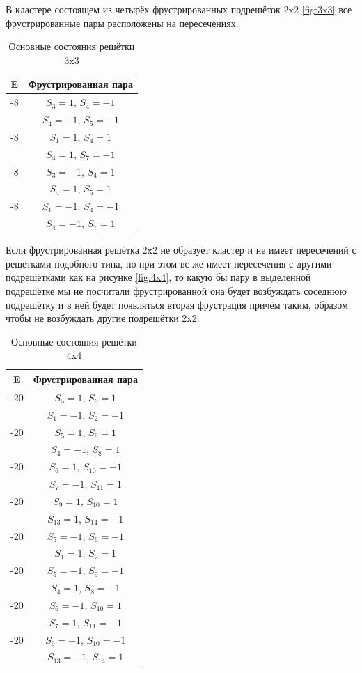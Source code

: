 \documentclass[utf8, babel, sor, jor, amsmath,amssymb, reprint]{elsarticle} %
\begin{document}
В кластере состоящем из четырёх фрустрированных подрешёток 2x2 \ref{fig:3x3} все фрустрированные пары расположены на пересечениях.

\begin{table}[h]
	\centering
	\begin{tabular}{|c|c|}
		\hline
		E   &   Фрустрированная пара \\
		\hline
		-8   &  $S_3=1$, $S_4=-1$\\
		&    $S_4=-1$, $S_5=-1$ \\
		\hline
		-8   &  $S_1=1$, $S_4=1$\\
		&    $S_4=1$, $S_7=-1$ \\
		\hline
		-8   &  $S_3=-1$, $S_4=1$\\
			&    $S_4=1$, $S_5=1$ \\
		\hline
		-8   &  $S_1=-1$, $S_4=-1$\\
			&    $S_4=-1$, $S_7=1$ \\
		\hline
	\end{tabular}
	\caption{Основные состояния решётки 3x3}
	\label{tab:gs_3x3}
\end{table} 

Если фрустрированная решётка 2x2 не образует кластер и не имеет пересечений с решётками подобного типа, но при этом вс же имеет пересечения с другими подрешётками как на  рисунке \ref{fig:4x4}, то какую бы пару в выделенной подрешётке мы не посчитали фрустрированной она будет возбуждать соседнюю подрешётку и в ней будет появляться вторая фрустрация причём таким, образом чтобы не возбуждать другие подрешётки 2x2. 

\begin{table}[h]
	\centering
	\begin{tabular}{|c|c|}
		\hline
		E   &   Фрустрированная пара \\
		\hline
		-20   &  $S_5=1$, $S_6=1$\\
		&    $S_1=-1$, $S_2=-1$ \\
		\hline
		-20   &  $S_5=1$, $S_9=1$\\
		&    $S_4=-1$, $S_8=1$ \\
		\hline
		-20   &  $S_6=1$, $S_{10}=-1$\\
		&    $S_7=-1$, $S_11=1$ \\
		\hline
		-20   &  $S_9=1$, $S_{10}=1$\\
		&    $S_13=1$, $S_14=-1$ \\
		\hline
		-20   &  $S_5=-1$, $S_6=-1$\\
		&    $S_1=1$, $S_2=1$ \\
		\hline
		-20   &  $S_5=-1$, $S_9=-1$\\
		&    $S_4=1$, $S_8=-1$ \\
		\hline
		-20   &  $S_6=-1$, $S_{10}=1$\\
		&    $S_7=1$, $S_11=-1$ \\
		\hline
		-20   &  $S_9=-1$, $S_{10}=-1$\\
		&    $S_13=-1$, $S_14=1$ \\
		\hline
	\end{tabular}
	\caption{Основные состояния решётки 4x4}
	\label{tab:gs_4x4}
\end{table}
\end{document}

